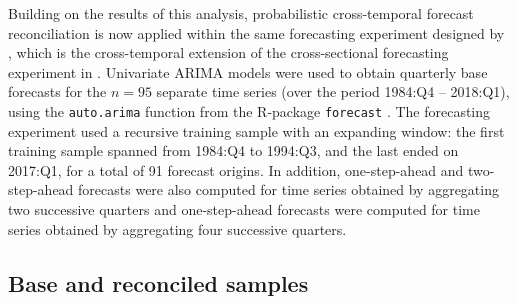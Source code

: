 \documentclass[a4paper,11pt]{article}
\theoremstyle{definition}
\begin{document}
Building on the results of this analysis, probabilistic cross-temporal forecast reconciliation is now applied within the same forecasting experiment designed by \cite{difonzo2023}, which is the cross-temporal extension of the cross-sectional forecasting experiment in \cite{athanasopoulos2020}.
Univariate ARIMA models were used to obtain quarterly base forecasts for the $n = 95$ separate time series (over the period 1984:Q4 -- 2018:Q1), using the \texttt{auto.arima} function from the \textsf{R}-package \texttt{forecast} \citep{Rforecast}. The forecasting experiment used a recursive training sample with an expanding window: the first training sample spanned from 1984:Q4 to 1994:Q3, and the last ended on 2017:Q1, for a total of 91 forecast origins. In addition, one-step-ahead and two-step-ahead forecasts were also computed for time series obtained by aggregating two successive quarters and one-step-ahead forecasts were computed for time series obtained by aggregating four successive quarters.


\subsection{Base and reconciled samples}\label{ssec:aus_br}
\end{document}
